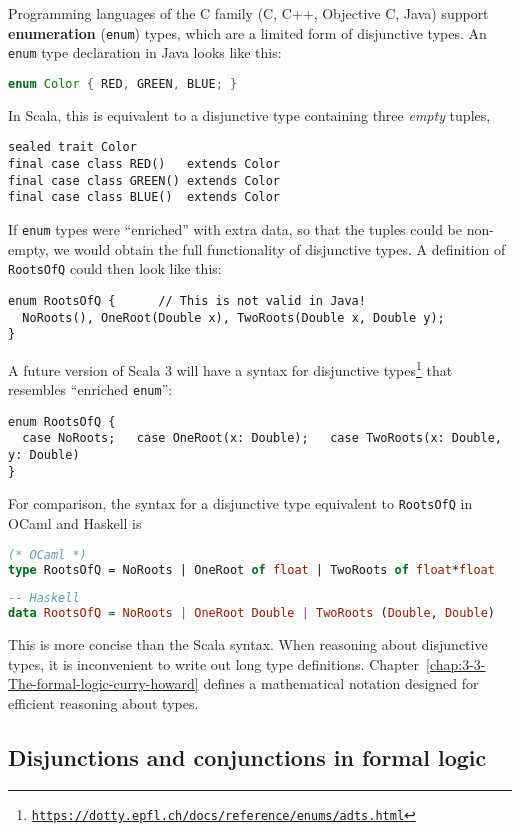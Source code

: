 Programming languages of the C family (C, C++, Objective C, Java)
support \textbf{enumeration} (\lstinline!enum!) types,
which are a limited form of disjunctive types. An \lstinline!enum!
type declaration in Java looks like this:
\begin{lstlisting}[language=Java]
enum Color { RED, GREEN, BLUE; } 
\end{lstlisting}
In Scala, this is equivalent to a disjunctive type containing three
\emph{empty} tuples,
\begin{lstlisting}
sealed trait Color
final case class RED()   extends Color
final case class GREEN() extends Color
final case class BLUE()  extends Color
\end{lstlisting}
If \lstinline!enum! types were ``enriched'' with extra data, so
that the tuples could be non-empty, we would obtain the full functionality
of disjunctive types. A definition of \lstinline!RootsOfQ! could
then look like this: 
\begin{lstlisting}
enum RootsOfQ {      // This is not valid in Java!
  NoRoots(), OneRoot(Double x), TwoRoots(Double x, Double y);
}
\end{lstlisting}
A future version of Scala 3 will have a syntax for disjunctive types\footnote{\texttt{\href{https://dotty.epfl.ch/docs/reference/enums/adts.html}{https://dotty.epfl.ch/docs/reference/enums/adts.html}}}
that resembles ``enriched \lstinline!enum!'':
\begin{lstlisting}
enum RootsOfQ {
  case NoRoots;   case OneRoot(x: Double);   case TwoRoots(x: Double, y: Double)
}
\end{lstlisting}
For comparison, the syntax for a disjunctive type equivalent to \lstinline!RootsOfQ!
in OCaml and Haskell is
\begin{lstlisting}[language=Caml]
(* OCaml *)
type RootsOfQ = NoRoots | OneRoot of float | TwoRoots of float*float
\end{lstlisting}
\begin{lstlisting}[language=Haskell]
-- Haskell
data RootsOfQ = NoRoots | OneRoot Double | TwoRoots (Double, Double)
\end{lstlisting}
This is more concise than the Scala syntax. When reasoning about disjunctive
types, it is inconvenient to write out long type definitions. Chapter~\ref{chap:3-3-The-formal-logic-curry-howard}
defines a mathematical notation designed for efficient reasoning about
types.

\subsection{Disjunctions and conjunctions in formal logic\label{subsec:Disjunctions-and-conjunctions}}

